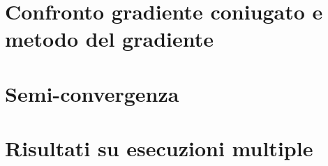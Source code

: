 \documentclass[11pt]{article}
\begin{document}
\section*{Confronto gradiente coniugato e metodo del gradiente}

\section*{Semi-convergenza}

\section*{Risultati su esecuzioni multiple}





\end{document}
